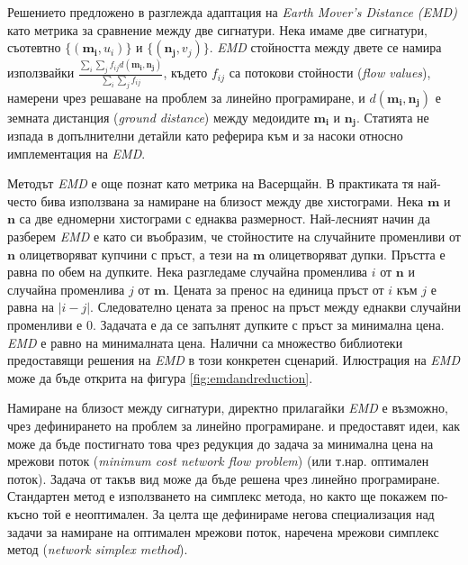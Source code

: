 \documentclass[a4paper,12pt]{article}
\begin{document}
Решението предложено в \cite{spinimages} разглежда адаптация на \textit{Earth Mover's Distance (EMD)} като метрика за сравнение между две сигнатури. Нека имаме две сигнатури, съотевтно $\{(\mathbf{m_i}, u_i)\}$ и $\{(\mathbf{n_j}, v_j)\}$. \textit{EMD} стойността между двете се намира използвайки $\frac{\sum_i \sum_j f_{ij} d(\mathbf{m_i}, \mathbf{n_j})}{\sum_i \sum_j f_{ij}}$, където $f_{ij}$ са потокови стойности (\textit{flow values}), намерени чрез решаване на проблем за линейно програмиране, и $d(\mathbf{m_i}, \mathbf{n_j})$ е земната дистанция (\textit{ground distance}) между медоидите $\mathbf{m_i}$ и $\mathbf{n_j}$. Статията не изпада в допълнителни детайли като реферира към \cite{metricfordistributionsforims} и \cite{imretrievalwithoutsegmentation} за насоки относно имплементация на \textit{EMD}.

\bigbreak

Методът \textit{EMD} е още познат като метрика на Васерщайн. В практиката тя най-често бива използвана за намиране на близост между две хистограми. Нека $\mathbf{m}$ и $\mathbf{n}$ са две едномерни хистограми с еднаква размерност. Най-лесният начин да разберем \textit{EMD} е като си въобразим, че стойностите на случайните променливи от $\mathbf{n}$ олицетворяват купчини с пръст, а тези на $\mathbf{m}$ олицетворяват дупки. Пръстта е равна по обем на дупките. Нека разгледаме случайна променлива $i$ от $\mathbf{n}$ и случайна променлива $j$ от $\mathbf{m}$. Цената за пренос на единица пръст от $i$ към $j$ е равна на $|i-j|$. Следователно цената за пренос на пръст между еднакви случайни променливи е $0$. Задачата е да се запълнят дупките с пръст за минимална цена. \textit{EMD} е равно на минималната цена. Налични са множество библиотеки предоставящи решения на \textit{EMD} в този конкретен сценарий. Илюстрация на \textit{EMD} може да бъде открита на фигура \ref{fig:emdandreduction}.

\bigbreak

Намиране на близост между сигнатури, директно прилагайки \textit{EMD} е възможно, чрез дефинирането на проблем за линейно програмиране. \cite{metricfordistributionsforims} и \cite{imretrievalwithoutsegmentation} предоставят идеи, как може да бъде постигнато това чрез редукция до задача за минимална цена на мрежови поток (\textit{minimum cost network flow problem}) (или т.нар. оптимален поток). Задача от такъв вид може да бъде решена чрез линейно програмиране. Стандартен метод е използването на симплекс метода, но както ще покажем по-късно той е неоптимален. За целта ще дефинираме негова специализация над задачи за намиране на оптимален мрежови поток, наречена мрежови симплекс метод (\textit{network simplex method}).
\end{document}
